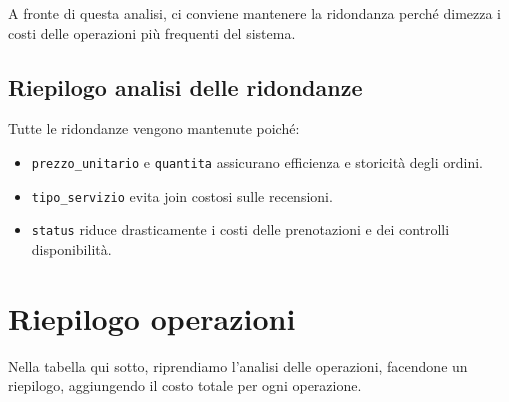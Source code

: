 \documentclass[a4paper,12pt]{report}
\begin{document}
\noindent
A fronte di questa analisi, ci conviene mantenere la ridondanza perché dimezza i costi delle operazioni più frequenti del sistema.

\subsection*{Riepilogo analisi delle ridondanze}
Tutte le ridondanze vengono mantenute poiché:
\begin{itemize}
    \item \texttt{prezzo\_unitario} e \texttt{quantita} assicurano efficienza e storicità degli ordini.
    \item \texttt{tipo\_servizio} evita join costosi sulle recensioni.
    \item \texttt{status} riduce drasticamente i costi delle prenotazioni e dei controlli disponibilità.
\end{itemize}

\newpage
\section{Riepilogo operazioni}
Nella tabella qui sotto, riprendiamo l'analisi delle operazioni, facendone un riepilogo, aggiungendo
il costo totale per ogni operazione.
\end{document}
